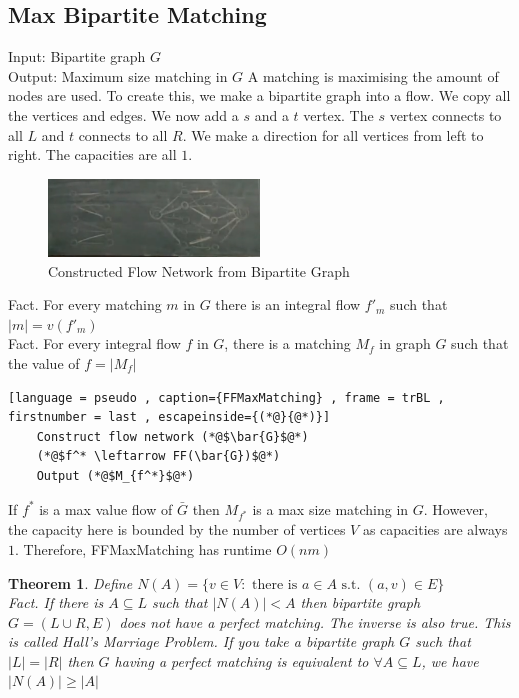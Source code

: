 \documentclass[a4paper]{article}
\theoremstyle{plain}
\newtheorem{thm}{Theorem}[section]
\theoremstyle{definition}
\theoremstyle{remark}
\begin{document}
	\subsection{Max Bipartite Matching}
	Input: Bipartite graph $G$ \\
	Output: Maximum size matching in $G$
	A matching is maximising the amount of nodes are used. To create this, we make a bipartite graph into a flow. We copy all the vertices and edges. We now add a $s$ and a $t$ vertex. The $s $ vertex connects to all $L$ and $t $ connects to all $R$. We make a direction for all vertices from left to right. The capacities are all $1$. \\
	\begin{figure}[H]
		\centering
		\includegraphics[width=0.5\textwidth]{three.png}
		\caption{Constructed Flow Network from Bipartite Graph}
		\label{fig:three-png}
	\end{figure}
	Fact. For every matching $m$ in $G$ there is an integral flow $f'_m$ such that $|m| = v(f'_m)$\\
	Fact. For every integral flow  $f$ in $G$, there is a matching $M_f$ in graph $G$ such that the value of $f = |M_f|$
	\begin{lstlisting}[language = pseudo , caption={FFMaxMatching} , frame = trBL , firstnumber = last , escapeinside={(*@}{@*)}]
	Construct flow network (*@$\bar{G}$@*)
	(*@$f^* \leftarrow FF(\bar{G})$@*)
	Output (*@$M_{f^*}$@*)
	\end{lstlisting}
	If $f^{*}$ is a max value flow of $\bar{G}$ then $M_{f^{*}}$ is a max size matching in $G$. However, the capacity here is bounded by the number of vertices $V$ as capacities are always $1$. Therefore, FFMaxMatching has runtime $O(nm)$
	\begin{thm}
		Define $N(A) = \{v \in V : \text{ there is $a \in A$ s.t. $(a,v) \in E$} \}$ \\
		 Fact. If there is $A \subseteq L$ such that $|N(A)| < A$ then bipartite graph $G = (L \cup R, E) $ does not have a perfect matching. The inverse is also true. This is called Hall's Marriage Problem. If you take a bipartite graph $G$ such that $|L| = |R|$ then $G$ having a perfect matching is equivalent to $\forall A \subseteq L$, we have $|N(A)| \ge |A|$
	\end{thm}
\end{document}
